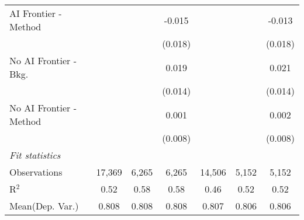 \begin{tabular}{lcccccc}
   AI Frontier - Method    &               &              & -0.015        &               &               & -0.013\\   
                           &               &              & (0.018)       &               &               & (0.018)\\   
   No AI Frontier - Bkg.   &               &              & 0.019         &               &               & 0.021\\   
                           &               &              & (0.014)       &               &               & (0.014)\\   
   No AI Frontier - Method &               &              & 0.001         &               &               & 0.002\\   
                           &               &              & (0.008)       &               &               & (0.008)\\   
   \midrule
   \emph{Fit statistics}\\
   Observations            & 17,369        & 6,265        & 6,265         & 14,506        & 5,152         & 5,152\\  
   R$^2$                   & 0.52          & 0.58         & 0.58          & 0.46          & 0.52          & 0.52\\  
Mean(Dep. Var.) & 0.808 & 0.808 & 0.808 & 0.807 & 0.806 & 0.806 \\
   

\end{tabular}
